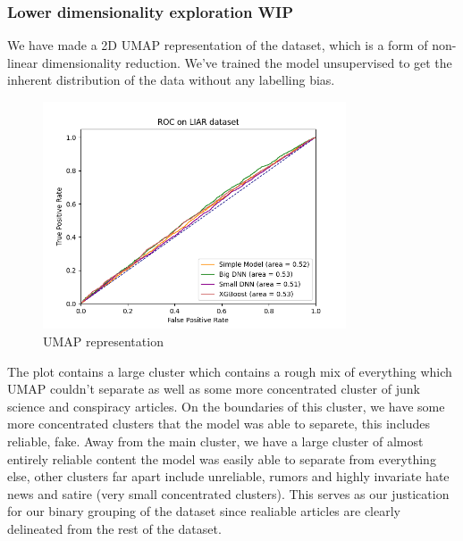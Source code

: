 \subsubsection{Lower dimensionality exploration WIP}
We have made a 2D UMAP representation of the dataset, which is a form of non-linear dimensionality reduction. We've
trained the model unsupervised to get the inherent distribution of the data without any labelling bias.
\begin{figure}[htpb]
  \centering
  \includegraphics[width=0.8\textwidth]{figures/ROC_LIAR}
  \caption{UMAP representation}
  \label{fig:umap_explore}
\end{figure}

The plot contains a large cluster which contains a rough mix of everything which UMAP couldn't separate as well as some more concentrated cluster of junk science and conspiracy articles. On the boundaries of this cluster, we have some more concentrated clusters that the model was able to separete, this includes reliable, fake. Away from the main cluster, we have a large cluster of almost entirely reliable content the model was easily able to separate from everything else, other clusters far apart include unreliable, rumors and highly invariate hate news and satire (very small concentrated clusters). This serves as our justication for our binary grouping of the dataset since realiable articles are clearly delineated from the rest of the dataset. 



